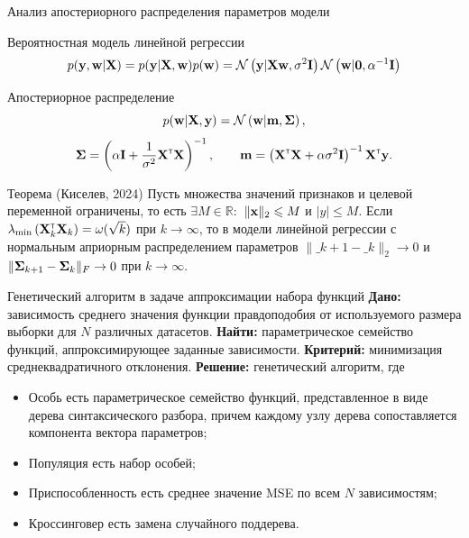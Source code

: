 \documentclass[10pt]{beamer}
\begin{document}
\begin{frame}{Анализ апостериорного распределения параметров модели}
    \begin{block}{Вероятностная модель линейной регрессии}
        \[ p(\mathbf{y}, \mathbf{w} | \mathbf{X}) = p(\mathbf{y} | \mathbf{X}, \mathbf{w}) p(\mathbf{w}) = \mathcal{N}\left( \mathbf{y} | \mathbf{X} \mathbf{w}, \sigma^2 \mathbf{I} \right) \mathcal{N}\left( \mathbf{w} | \mathbf{0}, \alpha^{-1} \mathbf{I} \right) \]
    \end{block}
    \vfill
    \begin{block}{Апостериорное распределение}
        \[ p(\mathbf{w} | \mathbf{X}, \mathbf{y}) = \mathcal{N}\left( \mathbf{w} | \mathbf{m}, \boldsymbol{\Sigma} \right), \]
        \[ \boldsymbol{\Sigma} = \left( \alpha \mathbf{I} + \dfrac{1}{\sigma^2} \mathbf{X}^{\text{\tiny\sffamily\upshape\mdseries T}} \mathbf{X} \right)^{-1}, \qquad \mathbf{m} = \left( \mathbf{X}^{\text{\tiny\sffamily\upshape\mdseries T}} \mathbf{X} + \alpha \sigma^2 \mathbf{I} \right)^{-1} \mathbf{X}^{\text{\tiny\sffamily\upshape\mdseries T}} \mathbf{y}. \]
    \end{block}
    \vfill
    \begin{block}{Теорема (Киселев, 2024)}
        Пусть множества значений признаков и целевой переменной ограничены, то есть $\exists M \in \mathbb{R}:$ $\| \mathbf{x} \|_2 \leqslant M$ и $|y| \leqslant M$. Если  $\lambda_{\min}\left( \mathbf{X}^{\text{\tiny\sffamily\upshape\mdseries T}}_k \mathbf{X}_k \right) = \omega(\sqrt{k})$ при $k \to \infty$, то в модели линейной регрессии с нормальным априорным распределением параметров $\| \bm_{k+1} - \bm_k \|_2 \to 0$ и  $\| \boldsymbol{\Sigma}_{k+1} - \boldsymbol{\Sigma}_k \|_{F} \to 0$ при $k \to \infty$.
    \end{block}
\end{frame}
\begin{frame}{Генетический алгоритм в задаче аппроксимации набора функций}
    \textbf{Дано:} зависимость среднего значения функции правдоподобия от используемого размера выборки для $N$ различных датасетов.
    \vfill
    \textbf{Найти:} параметрическое семейство функций, аппроксимирующее заданные зависимости.
    \vfill
    \textbf{Критерий:} минимизация среднеквадратичного отклонения.
    \vfill
    \textbf{Решение:} генетический алгоритм, где
    \begin{itemize}
        \item Особь есть параметрическое семейство функций, представленное в виде дерева синтаксического разбора, причем каждому узлу дерева сопоставляется компонента вектора параметров;
        \item Популяция есть набор особей;
        \item Приспособленность есть среднее значение MSE по всем $N$ зависимостям;
        \item Кроссинговер есть замена случайного поддерева.
    \end{itemize}
\end{frame}
\end{document}
